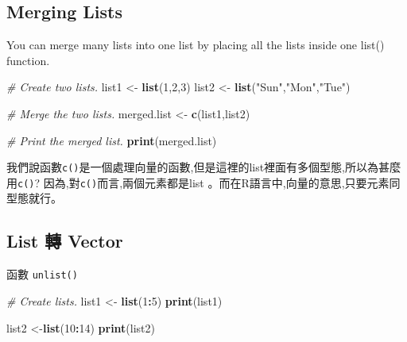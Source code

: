 \documentclass[]{book}
\newenvironment{Shaded}{\begin{snugshade}}{\end{snugshade}}
\newcommand{\KeywordTok}[1]{\textcolor[rgb]{0.13,0.29,0.53}{\textbf{#1}}}
\newcommand{\DecValTok}[1]{\textcolor[rgb]{0.00,0.00,0.81}{#1}}
\newcommand{\StringTok}[1]{\textcolor[rgb]{0.31,0.60,0.02}{#1}}
\newcommand{\CommentTok}[1]{\textcolor[rgb]{0.56,0.35,0.01}{\textit{#1}}}
\newcommand{\OperatorTok}[1]{\textcolor[rgb]{0.81,0.36,0.00}{\textbf{#1}}}
\newcommand{\NormalTok}[1]{#1}
\theoremstyle{definition}
\theoremstyle{definition}
\theoremstyle{definition}
\theoremstyle{remark}
\begin{document}
\subsection{Merging Lists}\label{merging-lists}

You can merge many lists into one list by placing all the lists inside
one list() function.

\begin{Shaded}
\begin{Highlighting}[]
\CommentTok{# Create two lists.}
\NormalTok{list1 <-}\StringTok{ }\KeywordTok{list}\NormalTok{(}\DecValTok{1}\NormalTok{,}\DecValTok{2}\NormalTok{,}\DecValTok{3}\NormalTok{)}
\NormalTok{list2 <-}\StringTok{ }\KeywordTok{list}\NormalTok{(}\StringTok{"Sun"}\NormalTok{,}\StringTok{"Mon"}\NormalTok{,}\StringTok{"Tue"}\NormalTok{)}

\CommentTok{# Merge the two lists.}
\NormalTok{merged.list <-}\StringTok{ }\KeywordTok{c}\NormalTok{(list1,list2)}

\CommentTok{# Print the merged list.}
\KeywordTok{print}\NormalTok{(merged.list)}
\end{Highlighting}
\end{Shaded}

我們說函數\texttt{c()}是一個處理向量的函數,但是這裡的list裡面有多個型態,所以為甚麼用\texttt{c()}?
因為,對\texttt{c()}而言,兩個元素都是list
。而在R語言中,向量的意思,只要元素同型態就行。

\subsection{List 轉 Vector}\label{list--vector}

函數 \texttt{unlist()}

\begin{Shaded}
\begin{Highlighting}[]
\CommentTok{# Create lists.}
\NormalTok{list1 <-}\StringTok{ }\KeywordTok{list}\NormalTok{(}\DecValTok{1}\OperatorTok{:}\DecValTok{5}\NormalTok{)}
\KeywordTok{print}\NormalTok{(list1)}
\end{Highlighting}
\end{Shaded}

\begin{Shaded}
\begin{Highlighting}[]
\NormalTok{list2 <-}\KeywordTok{list}\NormalTok{(}\DecValTok{10}\OperatorTok{:}\DecValTok{14}\NormalTok{)}
\KeywordTok{print}\NormalTok{(list2)}
\end{Highlighting}
\end{Shaded}
\end{document}
